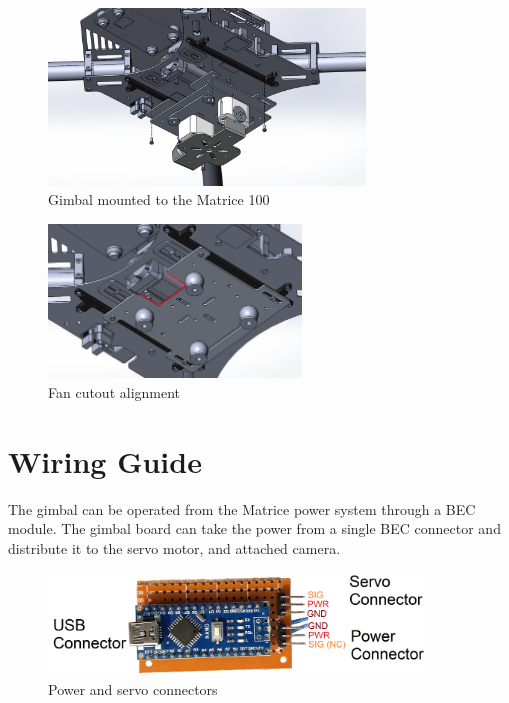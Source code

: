 \documentclass[11pt]{article} %
\begin{document}
\begin{figure}[H]
\begin{centering}
\includegraphics[width = 0.75\textwidth]{Pictures/matrice_mount.png}
\caption{Gimbal mounted to the Matrice 100}
\label{fig:mount}
\end{centering}
\end{figure}
\begin{figure}[H]
\begin{centering}
\includegraphics[width = 0.6\textwidth]{Pictures/fan_cutout.png}
\caption{Fan cutout alignment}
\label{fig:fan}
\end{centering}
\end{figure}

\section{Wiring Guide}
The gimbal can be operated from the Matrice power system through a BEC module. The gimbal board can take the power from a single BEC connector and distribute it to the servo motor, and attached camera. 
\begin{figure}[H]
\begin{centering}
\includegraphics[width = 0.9\textwidth]{Pictures/power_connectors.png}
\caption{Power and servo connectors}
\label{fig:pwr_con}
\end{centering}
\end{figure}
\end{document}
